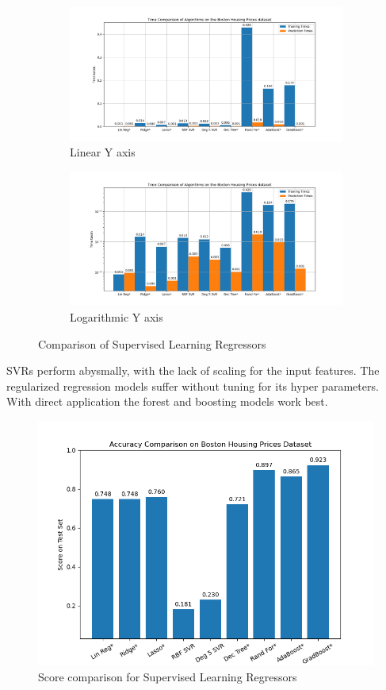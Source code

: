 \documentclass{article}
\begin{document}
\begin{figure}[H]
\centering
\begin{subfigure}{.5\textwidth}
  \centering
  \includegraphics[width=\linewidth]{Images/sup_learn_comp_lin_.png}
  \caption{Linear Y axis}
\end{subfigure}%
\begin{subfigure}{.5\textwidth}
  \centering
  \includegraphics[width=\linewidth]{Images/sup_learn_comp_log_.png}
  \caption{Logarithmic Y axis}
\end{subfigure}
\caption{Comparison of Supervised Learning Regressors}
\end{figure}

SVRs perform abysmally, with the lack of scaling for the input features. The regularized regression models suffer without tuning for its hyper parameters. With direct application the forest and boosting models work best.

\begin{figure}[H]
\includegraphics[width=0.6\linewidth]{Images/sup_learn_comp_sco_.png}
\centering
\caption{Score comparison for Supervised Learning Regressors}
\end{figure}
\end{document}
